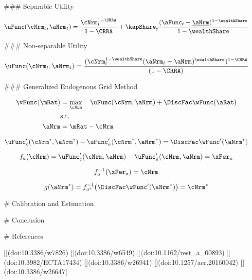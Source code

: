 ### Separable Utility

\begin{equation}
    \uFunc(\cNrm_{t}, \aNrm_{t}) = \frac{\cNrm_{t}^{1-\CRRA}}{1-\CRRA} + \kapShare_{t} \frac{(\aFunc_{t} - \underline\aNrm)^{1-\wealthShare}}{1-\wealthShare}
\end{equation}

### Non-separable Utility

\begin{equation}
    \uFunc(\cNrm_{t}, \aNrm_{t}) = \frac{(\cNrm_{t}^{1-\wealthShare} (\aNrm_{t}- \underline\aNrm)^\wealthShare)^{1-\CRRA}}{(1-\CRRA)}
\end{equation}

### Generalized Endogenous Grid Method

\begin{align}
    \vFunc(\mRat) & = \max_{\cNrm}~~~ \uFunc(\cNrm, \aNrm) + \DiscFac \wFunc(\aRat)
    \\ & \text{s.t.}
    \\ \aNrm & = \mRat-\cNrm
\end{align}

\begin{equation}
    \uFunc_{c}'(\cNrm^*, \aNrm^*) - \uFunc_{a}'(\cNrm^*, \aNrm^*) = \DiscFac \wFunc'(\aNrm^*)
\end{equation}

\begin{equation}
    f_{a}(\cNrm) = \uFunc_{c}'(\cNrm, \aNrm) - \uFunc_{a}'(\cNrm, \aNrm) = \xFer_{a}
\end{equation}

\begin{equation}
    f_{a}^{-1}(\xFer_{a}) = \cNrm
\end{equation}

\begin{equation}
    g(\aNrm^*) = f_{a^*}^{-1} \big( \DiscFac \wFunc'(\aNrm^*) \big) = \cNrm^*
\end{equation}

# Calibration and Estimation

# Conclusion

# References

    [](doi:10.3386/w7826)
[](doi:10.3386/w6549)
[](doi:10.1162/rest_a_00893)
[](doi:10.3982/ECTA17434)
[](doi:10.3386/w26941)
[](doi:10.1257/aer.20160042)
[](doi:10.3386/w26647)